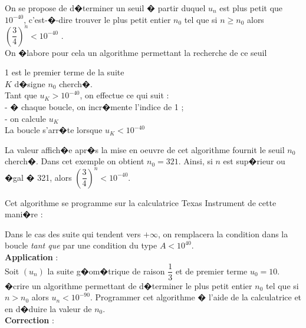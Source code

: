 \documentclass[a4paper,12pt,twoside,french]{extarticle}
\begin{document}
\noindent On se propose de d�terminer un seuil � partir duquel $u_n$ est plus petit que $10^{-40}$, c'est-�-dire trouver le plus petit entier $n_0$ tel que si $n \geqslant n_0$  alors $\left(\dfrac{3}{4}\right)^n<10^{-40}$ .\\

\noindent On �labore pour cela un algorithme permettant la recherche de ce seuil 
\begin{multicols}{2}
\medskip


\columnbreak


\noindent \vphantom{\LARGE A}1 est le premier terme de la suite\\
$K$ d�signe $n_0$ cherch�.\\
Tant que $u_K > 10^{-40}$, on effectue ce qui suit :\\
- � chaque boucle, on incr�mente l'indice de 1 ;\\
- on calcule $u_K$ \\
La boucle s'arr�te lorsque $u_K<10^{-40}$
\end{multicols}
\noindent La valeur affich�e apr�s la mise en oeuvre de cet algorithme fournit le seuil $n_0$ cherch�. Dans cet exemple on obtient $n_0=321$. Ainsi, si $n$ est sup�rieur ou �gal � 321, alors $\left(\dfrac{3}{4}\right)^n < 10^{-40}$.

\noindent Cet algorithme se programme sur la calculatrice Texas Instrument de cette mani�re :


\noindent Dans le cas des suite qui tendent vers $+\infty$, on remplacera la condition dans la boucle \emph{tant que} par une condition du type $A<10^{40}$.\\ 

\noindent \textbf{Application} : \\

\noindent Soit $(u_n)$ la suite g�om�trique de raison $\dfrac{1}{3}$ et de premier terme $u_0=10$.\\
\noindent �crire un algorithme permettant de d�terminer le plus petit entier $n_0$ tel que si $n > n_0$ alors $u_n < 10^{-90}$. Programmer cet algorithme � l'aide de la calculatrice et en d�duire la valeur de $n_0$.\\


\noindent \textbf{Correction} :\\
\end{document}
